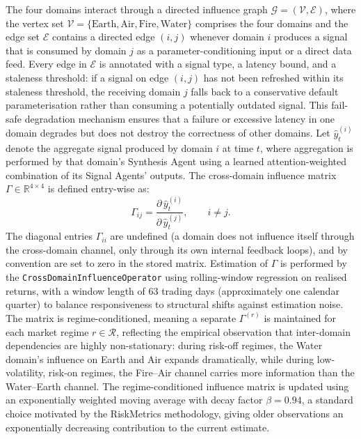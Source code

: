 \documentclass[12pt,openany]{book}
\numberwithin{equation}{chapter}
\theoremstyle{plain}
\theoremstyle{definition}
\theoremstyle{remark}
\begin{document}
The four domains interact through a directed influence graph $\mathcal{G} = (\mathcal{V}, \mathcal{E})$, where the vertex set $\mathcal{V} = \{\mathrm{Earth}, \mathrm{Air}, \mathrm{Fire}, \mathrm{Water}\}$ comprises the four domains and the edge set $\mathcal{E}$ contains a directed edge $(i, j)$ whenever domain $i$ produces a signal that is consumed by domain $j$ as a parameter-conditioning input or a direct data feed. Every edge in $\mathcal{E}$ is annotated with a signal type, a latency bound, and a staleness threshold: if a signal on edge $(i, j)$ has not been refreshed within its staleness threshold, the receiving domain $j$ falls back to a conservative default parameterisation rather than consuming a potentially outdated signal. This fail-safe degradation mechanism ensures that a failure or excessive latency in one domain degrades but does not destroy the correctness of other domains. Let $\hat{y}_t^{(i)}$ denote the aggregate signal produced by domain $i$ at time $t$, where aggregation is performed by that domain's Synthesis Agent using a learned attention-weighted combination of its Signal Agents' outputs. The cross-domain influence matrix $\Gamma \in \mathbb{R}^{4 \times 4}$ is defined entry-wise as:
\begin{equation}
    \Gamma_{ij} = \frac{\partial\, \hat{y}_t^{(i)}}{\partial\, \hat{y}_t^{(j)}}, \qquad i \neq j.
\end{equation}
The diagonal entries $\Gamma_{ii}$ are undefined (a domain does not influence itself through the cross-domain channel, only through its own internal feedback loops), and by convention are set to zero in the stored matrix. Estimation of $\Gamma$ is performed by the \texttt{CrossDomainInfluenceOperator} using rolling-window regression on realised returns, with a window length of 63 trading days (approximately one calendar quarter) to balance responsiveness to structural shifts against estimation noise. The matrix is regime-conditioned, meaning a separate $\Gamma^{(r)}$ is maintained for each market regime $r \in \mathcal{R}$, reflecting the empirical observation that inter-domain dependencies are highly non-stationary: during risk-off regimes, the Water domain's influence on Earth and Air expands dramatically, while during low-volatility, risk-on regimes, the Fire--Air channel carries more information than the Water--Earth channel. The regime-conditioned influence matrix is updated using an exponentially weighted moving average with decay factor $\beta = 0.94$, a standard choice motivated by the RiskMetrics methodology, giving older observations an exponentially decreasing contribution to the current estimate.
\end{document}
